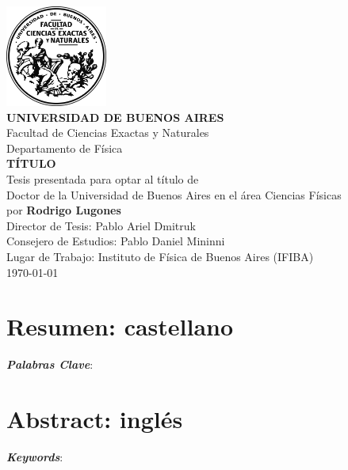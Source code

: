 \documentclass[12pt]{book}
\begin{document}
\frontmatter
\thispagestyle{empty}
\begin{center}
\large{
\includegraphics[width=0.25\textwidth]{logo.png}\vspace{1cm}\\
\textbf{UNIVERSIDAD DE BUENOS AIRES}\\
Facultad de Ciencias Exactas y Naturales\\
Departamento de Física\vspace{1.5cm}\\
\textbf{\LARGE TÍTULO}
\vspace{0.5cm}\\
Tesis presentada para optar al título de \\
Doctor de la Universidad de Buenos Aires en el área Ciencias Físicas\\
por \textbf{Rodrigo Lugones} \vspace{1.5cm}\\
Director de Tesis: Pablo Ariel Dmitruk\\
Consejero de Estudios: Pablo Daniel Mininni\\
Lugar de Trabajo: Instituto de Física de Buenos Aires (IFIBA)
\vspace{1.5cm}\\
\today
}
\end{center}

\newpage

\section*{Resumen: castellano}


\emph{\textbf{Palabras Clave}}: 
\newpage
\section*{Abstract: inglés}


\emph{\textbf{Keywords}}: 

\newpage
\end{document}
